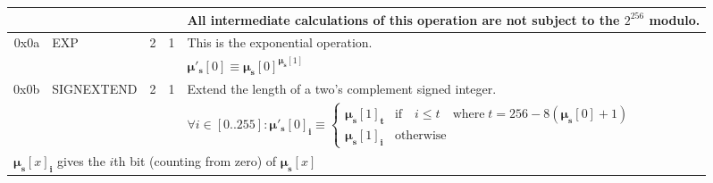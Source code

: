\documentclass[9pt,oneside]{amsart}
\begin{document}
\begin{tabularx}{\textwidth}{rlrrX}
&&&& All intermediate calculations of this operation are not subject to the $2^{256}$ modulo. \\
\midrule
0x0a & {\small EXP} & 2 & 1 & This is the exponential operation. \\
&&&& $\boldsymbol{\mu}'_\mathbf{s}[0] \equiv \boldsymbol{\mu}_\mathbf{s}[0] ^ {\boldsymbol{\mu}_\mathbf{s}[1] }$ \\
\midrule
0x0b & {\small SIGNEXTEND} & 2 & 1 & Extend the length of a two's complement signed integer. \\
&&&& $ \forall i \in [0..255]: \boldsymbol{\mu}'_\mathbf{s}[0]_\mathbf{i} \equiv \begin{cases} \boldsymbol{\mu}_\mathbf{s}[1]_\mathbf{t} &\text{if} \quad i \leqslant t \quad \text{where} \; t = 256 - 8(\boldsymbol{\mu}_\mathbf{s}[0] + 1) \\ \boldsymbol{\mu}_\mathbf{s}[1]_\mathbf{i} &\text{otherwise} \end{cases}$ \\
\multicolumn{5}{l}{$\boldsymbol{\mu}_\mathbf{s}[x]_\mathbf{i}$ gives the $i$th bit (counting from zero) of $\boldsymbol{\mu}_\mathbf{s}[x]$} \vspace{5pt} \\
\end{tabularx}
\end{document}
